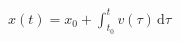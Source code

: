 \documentclass[border=2.5pt]{standalone}
\begin{document}
$\displaystyle x(t)=x_0+\int_{t_0}^t v(\tau)\,\mathrm d\tau$
\end{document}
